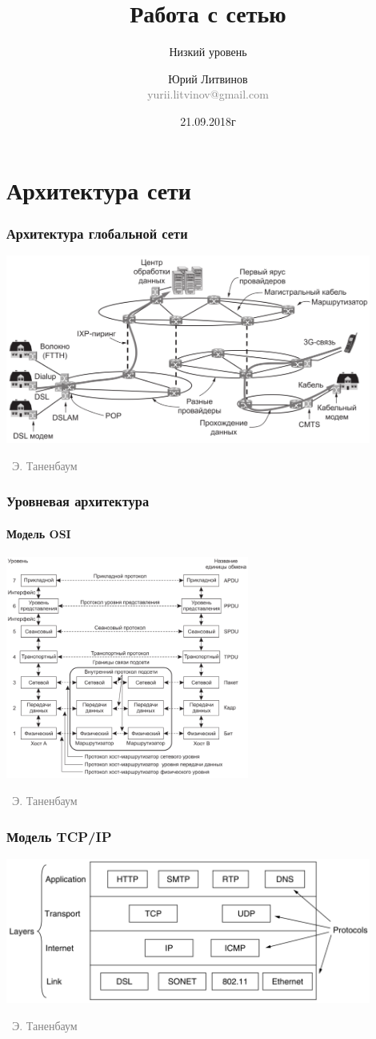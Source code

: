 \documentclass[xetex,mathserif,serif]{beamer}
\title{Работа с сетью}
\subtitle{Низкий уровень}
\author[Юрий Литвинов]{Юрий Литвинов\\\small{\textcolor{gray}{yurii.litvinov@gmail.com}}}
\date{21.09.2018г}
\newcommand{\attribution}[1] {
\vspace{-5mm}\begin{flushright}\begin{scriptsize}\textcolor{gray}{\textcopyright\, #1}\end{scriptsize}\end{flushright}
}
\begin{document}
	\frame{\titlepage}

	\section{Архитектура сети}

	\begin{frame}
		\frametitle{Архитектура глобальной сети}
		\begin{center}
			\includegraphics[width=0.9\textwidth]{internetArchitecture.png}
			\attribution{Э. Таненбаум}
		\end{center}
	\end{frame}

	\begin{frame}
		\frametitle{Уровневая архитектура}
		\framesubtitle{Модель OSI}
		\begin{center}
			\includegraphics[width=0.6\textwidth]{osiStack.png}
			\attribution{Э. Таненбаум}
		\end{center}
	\end{frame}

	\begin{frame}
		\frametitle{Модель TCP/IP}
		\begin{center}
			\includegraphics[width=0.9\textwidth]{tcpIpStack.png}
			\attribution{Э. Таненбаум}
		\end{center}
	\end{frame}
\end{document}
